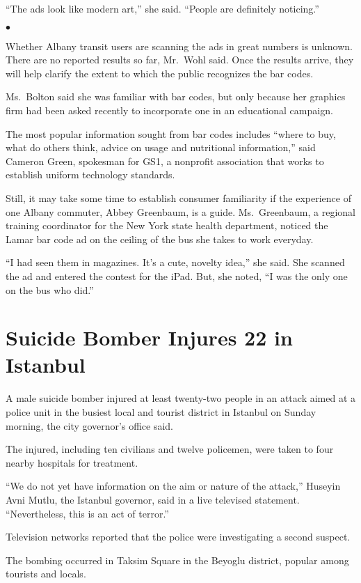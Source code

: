 ﻿\documentclass[12pt]{article}
\begin{document}
``The ads look like modern art,'' she said. ``People are definitely noticing.''

$\bullet$

Whether Albany transit users are scanning the ads in great numbers is unknown. There are no reported
results so far, Mr.~Wohl said. Once the results arrive, they will help clarify the extent to which
the public recognizes the bar codes.

Ms.~Bolton said she was familiar with bar codes, but only because her graphics firm had been asked
recently to incorporate one in an educational campaign.

The most popular information sought from bar codes includes ``where to buy, what do others think,
advice on usage and nutritional information,'' said Cameron Green, spokesman for GS1, a nonprofit
association that works to establish uniform technology standards.

Still, it may take some time to establish consumer familiarity if the experience of one Albany
commuter, Abbey Greenbaum, is a guide. Ms.~Greenbaum, a regional training coordinator for the New
York state health department, noticed the Lamar bar code ad on the ceiling of the bus she takes to
work everyday.

``I had seen them in magazines. It's a cute, novelty idea,'' she said. She scanned the ad and
entered the contest for the iPad. But, she noted, ``I was the only one on the bus who did.''

\section{Suicide Bomber Injures 22 in Istanbul}

\lettrine{A}{} male suicide bomber injured at least twenty-two people in an
attack aimed at a police unit in the busiest local and tourist district in Istanbul on Sunday
morning, the city governor's office said.

The injured, including ten civilians and twelve policemen, were taken to four nearby hospitals for
treatment.

``We do not yet have information on the aim or nature of the attack,'' Huseyin Avni Mutlu, the
Istanbul governor, said in a live televised statement. ``Nevertheless, this is an act of terror.''

Television networks reported that the police were investigating a second suspect.

The bombing occurred in Taksim Square in the Beyoglu district, popular among tourists and locals.
\end{document}
